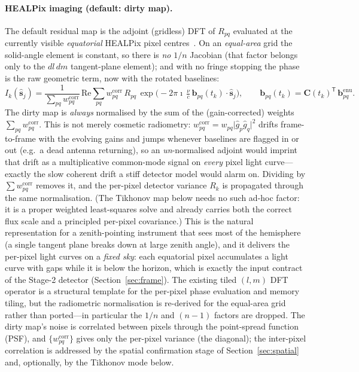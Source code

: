 \documentclass[11pt]{article}
\newcommand{\T}{^{\mathsf{T}}}
\begin{document}
\paragraph{HEALPix imaging (default: dirty map).} The default residual map is the adjoint
(gridless) DFT of $R_{pq}$ evaluated at the currently visible \emph{equatorial} HEALPix pixel
centres~\cite{healpix}. On an \emph{equal-area} grid the solid-angle element is constant, so there
is \emph{no} $1/n$ Jacobian (that factor belongs only to the $dl\,dm$ tangent-plane element); and
with no fringe stopping the phase is the raw geometric term, now with the rotated baselines:
\begin{equation}
  I_k(\hat{\bm{s}}_j)=\frac{1}{\sum_{pq} w^{\mathrm{corr}}_{pq}}\,\mathrm{Re}\!\sum_{pq}
  w^{\mathrm{corr}}_{pq}\,R_{pq}\,
  \exp\!\Big(\!-2\pi\imath\,\tfrac{\nu}{c}\,\bm{b}_{pq}(t_k)\cdot\hat{\bm{s}}_j\Big),
  \qquad
  \bm{b}_{pq}(t_k)=\bm{C}(t_k)\T\,\bm{b}^{\mathrm{enu}}_{pq}.
\end{equation}
The dirty map is \emph{always} normalised by the sum of the (gain-corrected) weights
$\sum_{pq} w^{\mathrm{corr}}_{pq}$. This is not merely cosmetic radiometry: $w^{\mathrm{corr}}_{pq}
=w_{pq}\lvert\hat g_p\hat g_q\rvert^2$ drifts frame-to-frame with the evolving gains and jumps
whenever baselines are flagged in or out (e.g.\ a dead antenna returning), so an \emph{un}-normalised
adjoint would imprint that drift as a multiplicative common-mode signal on \emph{every} pixel light
curve---exactly the slow coherent drift a stiff detector model would alarm on. Dividing by
$\sum w^{\mathrm{corr}}_{pq}$ removes it, and the per-pixel detector variance $R_k$ is propagated
through the same normalisation. (The Tikhonov map below needs no such ad-hoc factor: it is a proper
weighted least-squares solve and already carries both the correct flux scale and a principled
per-pixel covariance.) This is the natural representation for a zenith-pointing instrument that sees
most of the hemisphere (a single tangent plane breaks down at large zenith angle), and it delivers
the per-pixel light curves on a \emph{fixed sky}: each equatorial pixel accumulates a light curve
with gaps while it is below the horizon, which is exactly the input contract of the Stage-2 detector
(Section~\ref{sec:frame}). The existing tiled $(l,m)$ DFT operator is a structural template for the
per-pixel phase evaluation and memory tiling, but the radiometric normalisation is re-derived for
the equal-area grid rather than ported---in particular the $1/n$ and $(n-1)$ factors are dropped.
The dirty map's noise is correlated between pixels through the point-spread function (PSF), and
$\{w^{\mathrm{corr}}_{pq}\}$ gives only the per-pixel variance (the diagonal); the inter-pixel
correlation is addressed by the spatial confirmation stage of Section~\ref{sec:spatial} and,
optionally, by the Tikhonov mode below.
\end{document}
